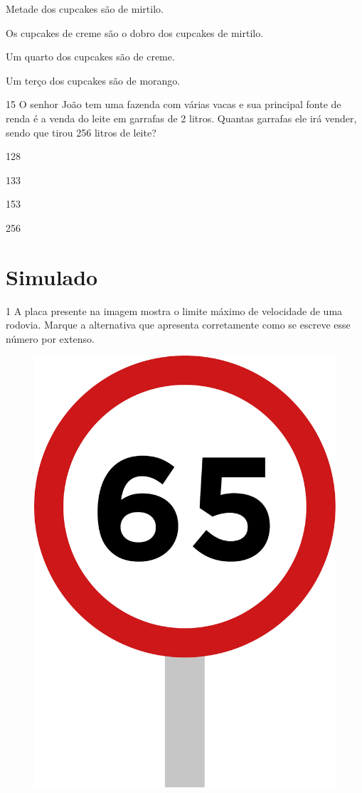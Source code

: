 
\begin{escolha}[itemsep=-5pt]
\item Metade dos cupcakes são de mirtilo.

\item Os cupcakes de creme são o dobro dos cupcakes de mirtilo.

\item Um quarto dos cupcakes são de creme.

\item Um terço dos cupcakes são de morango.
\end{escolha}


\num{15} O senhor João tem uma fazenda com várias vacas e sua principal fonte de renda é a venda do leite em garrafas de 2 litros. Quantas
garrafas ele irá vender, sendo que tirou 256 litros de leite?

\begin{escolha}[itemsep=-5pt]
\item 128

\item 133

\item 153

\item 256
\end{escolha}

\chapter[Simulado 4]{Simulado}

\num{1} A placa presente na imagem mostra o limite máximo de velocidade de uma
rodovia. Marque a alternativa que apresenta corretamente como se escreve
esse número por extenso.

\begin{figure}[H]
\centering
\includegraphics[width=.25\textwidth]{./media/image151.png}
\end{figure}

